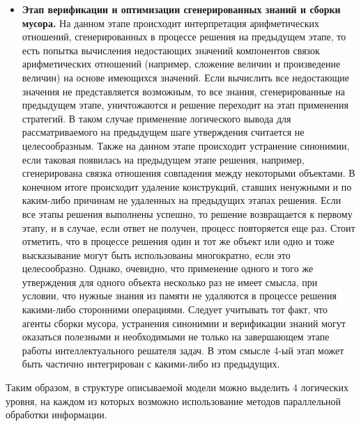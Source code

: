 \begin{itemize}
	\item{\textbf{Этап верификации и оптимизации сгенерированных знаний и сборки мусора.} На данном этапе происходит интерпретация арифметических отношений, сгенерированных в процессе решения на предыдущем этапе, то есть попытка вычисления недостающих значений компонентов связок арифметических отношений
	(например, сложение величин и произведение величин) на основе имеющихся значений. Если вычислить все недостающие значения не представляется возможным, то все знания, сгенерированные на предыдущем этапе,
	уничтожаются и решение переходит на этап применения стратегий. В таком случае применение логического вывода для рассматриваемого на предыдущем шаге утверждения считается не	целесообразным. Также на данном этапе происходит устранение синонимии, если таковая появилась на предыдущем этапе решения,
	например, сгенерирована связка отношения совпадения между некоторыми объектами. В конечном итоге происходит удаление конструкций, ставших ненужными и по каким-либо причинам не удаленных на предыдущих этапах решения. Если все этапы решения выполнены успешно, то решение возвращается к первому этапу, и в случае, если ответ не получен, процесс повторяется еще раз. Стоит отметить, что в процессе решения один и тот же объект или одно и тоже высказывание могут быть использованы многократно, если это целесообразно. Однако, очевидно, что применение одного и того же утверждения для одного объекта несколько раз не имеет смысла, при условии, что нужные знания из памяти не удаляются в процессе решения какими-либо сторонними операциями. Следует учитывать тот факт, что агенты сборки мусора, устранения синонимии и верификации знаний могут оказаться полезными и необходимыми не только на завершающем этапе работы интеллектуального решателя задач. В этом смысле 4-ый этап может быть частично интегрирован с какими-либо из предыдущих.}
\end{itemize}

Таким образом, в структуре описываемой модели можно выделить 4 логических уровня, на каждом из которых возможно использование методов параллельной обработки информации. 

